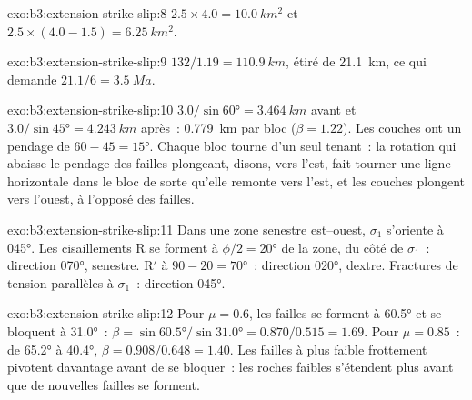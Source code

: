 \begin{solution}{exo:b3:extension-strike-slip:8}
$2.5\times4.0 = \qty{10.0}{km^2}$ et $2.5\times(4.0 - 1.5) =
\qty{6.25}{km^2}$.
\end{solution}

\begin{solution}{exo:b3:extension-strike-slip:9}
$132/1.19 = \qty{110.9}{km}$, étiré de \qty{21.1}{km}, ce qui demande
$21.1/6 = \qty{3.5}{Ma}$.
\end{solution}

\begin{solution}{exo:b3:extension-strike-slip:10}
$3.0/\sin\ang{60} = \qty{3.464}{km}$ avant et $3.0/\sin\ang{45} =
\qty{4.243}{km}$ après~: \qty{0.779}{km} par bloc ($\beta = 1.22$). Les couches
ont un pendage de $60 - 45 = \ang{15}$. Chaque bloc tourne d'un seul tenant~: la rotation qui
abaisse le pendage des failles plongeant, disons, vers l'est, fait tourner une ligne horizontale dans le
bloc de sorte qu'elle remonte vers l'est, et les couches plongent vers l'ouest, à l'opposé des
failles.
\end{solution}

\begin{solution}{exo:b3:extension-strike-slip:11}
Dans une zone senestre est--ouest, $\sigma_1$ s'oriente à \ang{045}. Les cisaillements R
se forment à $\phi/2 = \ang{20}$ de la zone, du côté de $\sigma_1$~: direction \ang{070},
senestre. R$'$ à $90 - 20 = \ang{70}$~: direction \ang{020}, dextre. Fractures de tension
parallèles à $\sigma_1$~: direction \ang{045}.
\end{solution}

\begin{solution}{exo:b3:extension-strike-slip:12}
Pour $\mu = 0.6$, les failles se forment à \ang{60.5} et se bloquent à \ang{31.0}~: $\beta =
\sin\ang{60.5}/\sin\ang{31.0} = 0.870/0.515 = 1.69$. Pour $\mu = 0.85$~: de
\ang{65.2} à \ang{40.4}, $\beta = 0.908/0.648 = 1.40$. Les failles à plus faible
frottement pivotent davantage avant de se bloquer~: les roches faibles s'étendent plus avant que
de nouvelles failles se forment.
\end{solution}

